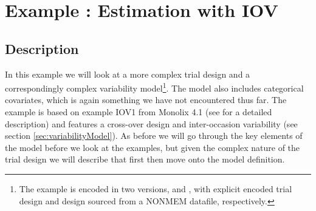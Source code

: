 \section{Example \theexamples: Estimation with IOV}
\label{sec:eg4}

\subsection{Description}

In this example we will look at a more complex trial design and a
correspondingly complex variability model\footnote{The example is 
encoded in two versions,  and , 
with explicit encoded trial design and design sourced from a NONMEM datafile, 
respectively.}. The model also includes categorical covariates, which is again 
something we have not encountered thus far. The example is based on 
example IOV1 from Monolix 4.1 (see \cite{Monolix4.1.4UserGuide:2012} for a detailed
description) and features a cross-over design and inter-occasion
variability (see section \ref{sec:variabilityModel}). As before we will
go through the key elements of the model before we look at the
\pharmml examples, but given the complex nature of the trial design we
will describe that first then move onto the model definition.


